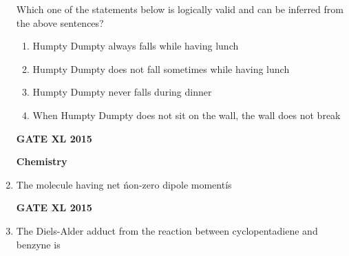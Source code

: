 \documentclass[journal,12pt,onecolumn]{IEEEtran}
\begin{document}
\begin{enumerate}
Which one of the statements below is logically valid and can be inferred from the above sentences?
    \begin{enumerate}
            \item Humpty Dumpty always falls while having lunch  
            \item Humpty Dumpty does not fall sometimes while having lunch
            \item Humpty Dumpty never falls during dinner
            \item When Humpty Dumpty does not sit on the wall, the wall does not break
    \end{enumerate}
\begin{flushright}\textbf{GATE XL 2015}\end{flushright}
	\textbf{Chemistry}
\item The molecule having net \' non-zero dipole moment\' is
    \begin{enumerate}
    \end{enumerate}
\begin{flushright}\textbf{GATE XL 2015}\end{flushright}
\item The Diels-Alder adduct from the reaction between cyclopentadiene and benzyne is
    \begin{enumerate}
\end{enumerate}
\end{enumerate}
\end{document}
